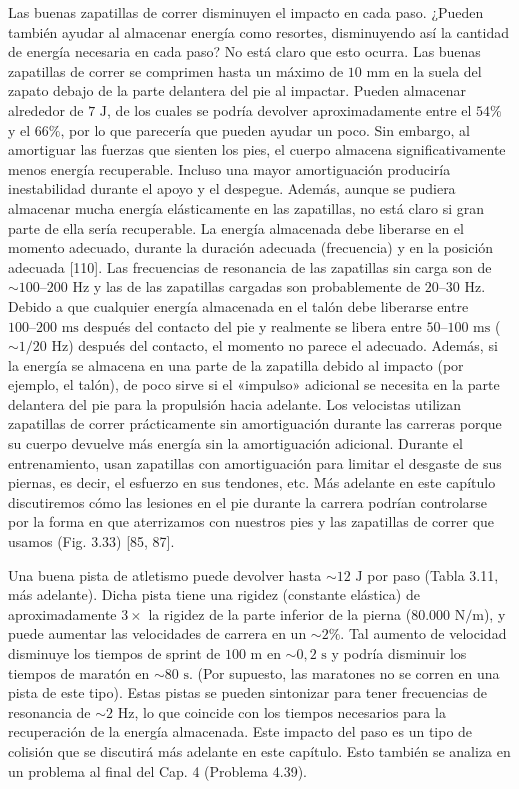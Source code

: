 \documentclass[12pt]{book}
\begin{document}
Las buenas zapatillas de correr disminuyen el impacto en cada paso. ¿Pueden también ayudar al almacenar energía como resortes, disminuyendo así la cantidad de energía necesaria en cada paso? No está claro que esto ocurra. Las buenas zapatillas de correr se comprimen hasta un máximo de $10\text{ mm}$ en la suela del zapato debajo de la parte delantera del pie al impactar. Pueden almacenar alrededor de $7\text{ J}$, de los cuales se podría devolver aproximadamente entre el $54\%$ y el $66\%$, por lo que parecería que pueden ayudar un poco. Sin embargo, al amortiguar las fuerzas que sienten los pies, el cuerpo almacena significativamente menos energía recuperable. Incluso una mayor amortiguación produciría inestabilidad durante el apoyo y el despegue. Además, aunque se pudiera almacenar mucha energía elásticamente en las zapatillas, no está claro si gran parte de ella sería recuperable. La energía almacenada debe liberarse en el momento adecuado, durante la duración adecuada (frecuencia) y en la posición adecuada [110]. Las frecuencias de resonancia de las zapatillas sin carga son de $\sim 100\text{--}200\text{ Hz}$ y las de las zapatillas cargadas son probablemente de $20\text{--}30\text{ Hz}$. Debido a que cualquier energía almacenada en el talón debe liberarse entre $100\text{--}200\text{ ms}$ después del contacto del pie y realmente se libera entre $50\text{--}100\text{ ms}$ ($\sim 1/20\text{ Hz}$) después del contacto, el momento no parece el adecuado. Además, si la energía se almacena en una parte de la zapatilla debido al impacto (por ejemplo, el talón), de poco sirve si el «impulso» adicional se necesita en la parte delantera del pie para la propulsión hacia adelante. Los velocistas utilizan zapatillas de correr prácticamente sin amortiguación durante las carreras porque su cuerpo devuelve más energía sin la amortiguación adicional. Durante el entrenamiento, usan zapatillas con amortiguación para limitar el desgaste de sus piernas, es decir, el esfuerzo en sus tendones, etc. Más adelante en este capítulo discutiremos cómo las lesiones en el pie durante la carrera podrían controlarse por la forma en que aterrizamos con nuestros pies y las zapatillas de correr que usamos (Fig. 3.33) [85, 87].

Una buena pista de atletismo puede devolver hasta $\sim 12\text{ J}$ por paso (Tabla 3.11, más adelante). Dicha pista tiene una rigidez (constante elástica) de aproximadamente $3\times$ la rigidez de la parte inferior de la pierna ($80.000\text{ N/m}$), y puede aumentar las velocidades de carrera en un $\sim 2\%$. Tal aumento de velocidad disminuye los tiempos de sprint de $100\text{ m}$ en $\sim 0,2\text{ s}$ y podría disminuir los tiempos de maratón en $\sim 80\text{ s}$. (Por supuesto, las maratones no se corren en una pista de este tipo). Estas pistas se pueden sintonizar para tener frecuencias de resonancia de $\sim 2\text{ Hz}$, lo que coincide con los tiempos necesarios para la recuperación de la energía almacenada. Este impacto del paso es un tipo de colisión que se discutirá más adelante en este capítulo. Esto también se analiza en un problema al final del Cap. 4 (Problema 4.39).
\end{document}
